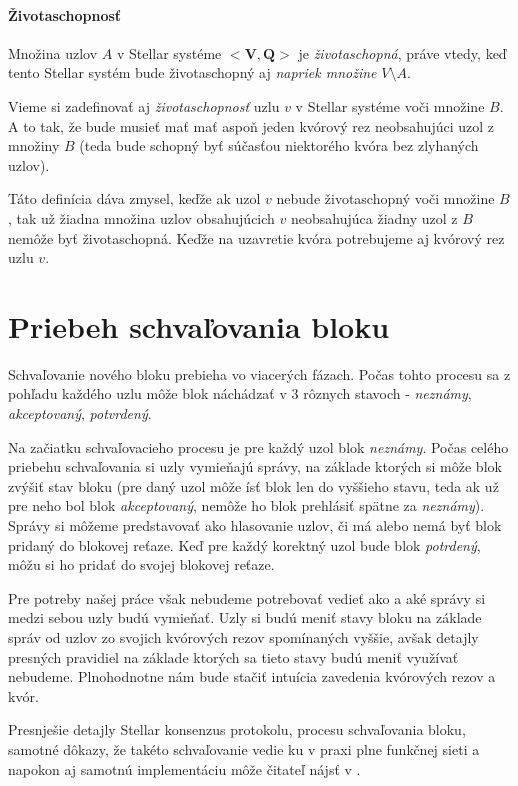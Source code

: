 \paragraph {Životaschopnosť}
Množina uzlov $A$ v Stellar systéme $<\textbf{V}, \textbf{Q}>$ je
\textit{životaschopná}, práve vtedy, keď tento Stellar systém bude životaschopný
aj \textit{napriek množine} $V \setminus A$.

\vspace{5mm}
Vieme si zadefinovať aj \textit{životaschopnosť} uzlu $v$ v Stellar systéme voči
množine $B$. A to tak, že bude musieť mať mať aspoň jeden kvórový rez neobsahujúci
uzol z množiny $B$ (teda bude schopný byť súčasťou niektorého kvóra bez zlyhaných uzlov).

Táto definícia dáva zmysel, keďže ak uzol $v$ nebude životaschopný voči množine $B$,
tak už žiadna množina uzlov obsahujúcich $v$ neobsahujúca žiadny uzol z $B$
nemôže byť životaschopná. Keďže na uzavretie kvóra potrebujeme aj kvórový rez uzlu $v$.

\section {Priebeh schvaľovania bloku}

Schvaľovanie nového bloku prebieha vo viacerých fázach. Počas tohto procesu sa 
z pohľadu každého uzlu môže blok náchádzať v 3 rôznych stavoch -
\textit{neznámy}, \textit{akceptovaný}, \textit{potvrdený}.

Na začiatku schvaľovacieho procesu je pre každý uzol blok \textit{neznámy}.
Počas celého priebehu schvaľovania si uzly vymieňajú správy, na základe ktorých
si môže blok zvýšiť stav bloku (pre daný uzol môže ísť blok len do vyššieho
stavu, teda ak už pre neho bol blok \textit{akceptovaný}, nemôže ho blok
prehlásiť spätne za \textit{neznámy}).
Správy si môžeme predstavovať ako hlasovanie uzlov, či má alebo nemá byť
blok pridaný do blokovej reťaze.
Keď pre každý korektný uzol bude blok \textit{potrdený}, môžu si ho pridať
do svojej blokovej reťaze.

Pre potreby našej práce však nebudeme potrebovať vedieť ako a aké správy si medzi
sebou uzly budú vymieňať.
Uzly si budú meniť stavy bloku na základe správ od uzlov zo svojich kvórových rezov
spomínaných vyššie, avšak detajly presných pravidiel na základe ktorých sa tieto
stavy budú meniť využívať nebudeme. Plnohodnotne nám bude stačiť intuícia zavedenia
kvórových rezov a kvór.

Presnješie detajly Stellar konsenzus protokolu, procesu schvaľovania bloku,
samotné dôkazy, že takéto schvaľovanie vedie ku v praxi plne funkčnej sieti a
napokon aj samotnú implementáciu môže čitateľ nájsť v \cite{mazieres2015stellar}.

